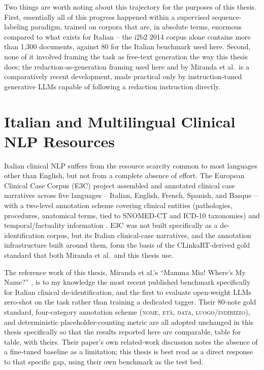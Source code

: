 \documentclass[12pt,a4paper]{report}
\newcommand{\NOME}{\textsc{nome}}
\newcommand{\ETA}{\textsc{et\`a}}
\newcommand{\DATA}{\textsc{data}}
\newcommand{\LUOGO}{\textsc{luogo\slash indirizzo}}
\begin{document}
Two things are worth noting about this trajectory for the purposes of this thesis. First, essentially all of this progress happened within a supervised sequence-labeling paradigm, trained on corpora that are, in absolute terms, enormous compared to what exists for Italian -- the i2b2 2014 corpus alone contains more than 1,300 documents, against 80 for the Italian benchmark used here. Second, none of it involved framing the task as free-text generation the way this thesis does; the redaction-as-generation framing used here and by Miranda et al.\ is a comparatively recent development, made practical only by instruction-tuned generative LLMs capable of following a redaction instruction directly.

\section{Italian and Multilingual Clinical NLP Resources}

Italian clinical NLP suffers from the resource scarcity common to most languages other than English, but not from a complete absence of effort. The European Clinical Case Corpus (E3C) project assembled and annotated clinical case narratives across five languages -- Italian, English, French, Spanish, and Basque -- with a two-level annotation scheme covering clinical entities (pathologies, procedures, anatomical terms, tied to SNOMED-CT and ICD-10 taxonomies) and temporal/factuality information \citep{magnini2020e3c}. E3C was not built specifically as a de-identification corpus, but its Italian clinical-case narratives, and the annotation infrastructure built around them, form the basis of the CLinkaRT-derived gold standard that both Miranda et al.\ and this thesis use.

The reference work of this thesis, Miranda et al.'s ``Mamma Mia! Where's My Name?'' \citep{miranda2025mamma}, is to my knowledge the most recent published benchmark specifically for Italian clinical de-identification, and the first to evaluate open-weight LLMs zero-shot on the task rather than training a dedicated tagger. Their 80-note gold standard, four-category annotation scheme (\NOME, \ETA, \DATA, \LUOGO), and deterministic placeholder-counting metric are all adopted unchanged in this thesis specifically so that the results reported here are comparable, table for table, with theirs. Their paper's own related-work discussion notes the absence of a fine-tuned baseline as a limitation; this thesis is best read as a direct response to that specific gap, using their own benchmark as the test bed.
\end{document}
